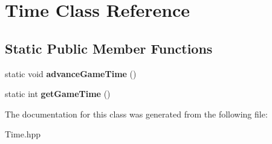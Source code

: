 \hypertarget{class_time}{}\section{Time Class Reference}
\label{class_time}
\subsection*{Static Public Member Functions}
\begin{DoxyCompactItemize}
\item 
\mbox{\label{class_time_a8affd432b8f0b23d4fd06325087da463}} 
static void {\bfseries advance\+Game\+Time} ()
\item 
\mbox{\label{class_time_a0ef12b6b2007fc2e7bc84363c6cd0482}} 
static int {\bfseries get\+Game\+Time} ()
\end{DoxyCompactItemize}


The documentation for this class was generated from the following file\+:\begin{DoxyCompactItemize}
\item 
Time.\+hpp\end{DoxyCompactItemize}
